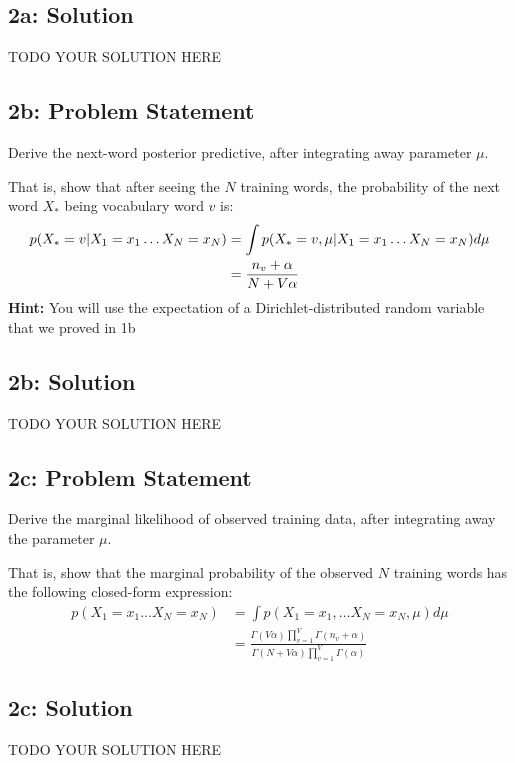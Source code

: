 \documentclass[10pt]{article}
\newcommand{\officialdirections}[1]{{\color{purple} #1}}
\begin{document}
\subsection{2a: Solution}
TODO YOUR SOLUTION HERE

\newpage
\officialdirections{
\subsection*{2b: Problem Statement}

Derive the next-word posterior predictive, after integrating away parameter $\mu$.

That is, show that after seeing the $N$ training words, the probability of the next word $X_*$ being vocabulary word $v$ is:
\begin{align}
p( X_* = v | X_1 = x_1 \ldots X_N = x_N)
	&= \int p( X_* = v, \mu | X_1 = x_1 \ldots X_N = x_N) d\mu
\notag \\
	&= \frac{n_v + \alpha}{N + V\alpha}
\end{align}
\textbf{Hint:} You will use the expectation of a Dirichlet-distributed random variable that we proved in 1b
}
\subsection{2b: Solution}

TODO YOUR SOLUTION HERE




\newpage
\officialdirections{
\subsection*{2c: Problem Statement}
Derive the marginal likelihood of observed training data, after integrating away the parameter $\mu$.

That is, show that the marginal probability of the observed $N$ training words has the following closed-form expression:
\begin{align}
p( X_1 = x_1 \ldots X_N = x_N) 
	&= \int p( X_1 = x_1, \ldots X_N = x_N, \mu ) d\mu
	\\
	&= \frac
	{ \Gamma(V \alpha)      \prod_{v=1}^V \Gamma( n_v + \alpha ) }
	{ \Gamma(N + V \alpha ) \prod_{v=1}^V \Gamma(\alpha)         }
\end{align}
}


\subsection{2c: Solution}
TODO YOUR SOLUTION HERE
\end{document}
